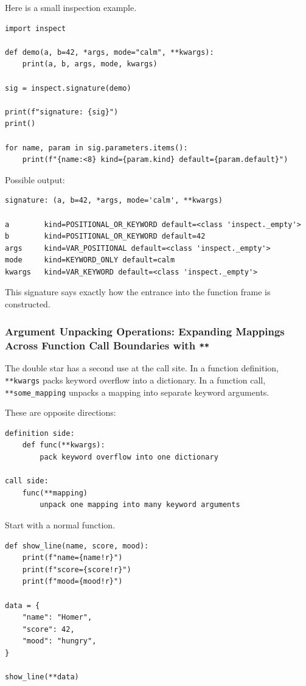 Here is a small inspection example.

\begin{verbatim}
import inspect

def demo(a, b=42, *args, mode="calm", **kwargs):
    print(a, b, args, mode, kwargs)

sig = inspect.signature(demo)

print(f"signature: {sig}")
print()

for name, param in sig.parameters.items():
    print(f"{name:<8} kind={param.kind} default={param.default}")
\end{verbatim}

Possible output:

\begin{verbatim}
signature: (a, b=42, *args, mode='calm', **kwargs)

a        kind=POSITIONAL_OR_KEYWORD default=<class 'inspect._empty'>
b        kind=POSITIONAL_OR_KEYWORD default=42
args     kind=VAR_POSITIONAL default=<class 'inspect._empty'>
mode     kind=KEYWORD_ONLY default=calm
kwargs   kind=VAR_KEYWORD default=<class 'inspect._empty'>
\end{verbatim}

This signature says exactly how the entrance into the function frame is constructed.

\subsubsection{Argument Unpacking Operations: Expanding Mappings Across Function Call Boundaries with \texttt{**}}

The double star has a second use at the call site. In a function definition, \texttt{**kwargs} packs keyword overflow into a dictionary. In a function call, \texttt{**some\_mapping} unpacks a mapping into separate keyword arguments.

These are opposite directions:

\begin{verbatim}
definition side:
    def func(**kwargs):
        pack keyword overflow into one dictionary

call side:
    func(**mapping)
        unpack one mapping into many keyword arguments
\end{verbatim}

Start with a normal function.

\begin{verbatim}
def show_line(name, score, mood):
    print(f"name={name!r}")
    print(f"score={score!r}")
    print(f"mood={mood!r}")

data = {
    "name": "Homer",
    "score": 42,
    "mood": "hungry",
}

show_line(**data)
\end{verbatim}

